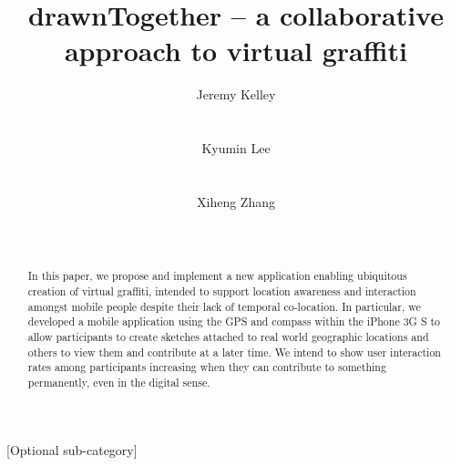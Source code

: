 \documentclass{chi2009}
\begin{document}
\setlength{\paperheight}{11in}
\setlength{\paperwidth}{8.5in}
\setlength{\pdfpageheight}{\paperheight}
\setlength{\pdfpagewidth}{\paperwidth}


\title{ drawnTogether -- a collaborative approach to virtual graffiti }
\author{
  \alignauthor Jeremy Kelley\\
    \\
    \\
  \alignauthor Kyumin Lee\\
    \\
    \\
  \alignauthor Xiheng Zhang\\
    \\
    \\
}

\maketitle

\begin{abstract}
In this paper, we propose and implement a new application enabling ubiquitous
creation of virtual graffiti, intended to support location awareness and
interaction amongst mobile people despite their lack of temporal co-location.
In particular, we developed a mobile application using the GPS and compass
within the iPhone 3G S to allow participants to create sketches attached to
real world geographic locations and others to view them and contribute at a
later time.  We intend to show user interaction rates among participants
increasing when they can contribute to something permanently, even in the
digital sense.
\end{abstract}


[Optional sub-category]
\end{document}
